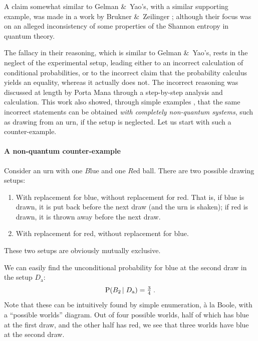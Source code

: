 \documentclass[\ifafour a4paper,12pt,\else a5paper,10pt,\fi%
onecolumn,oneside,article,%
british%
]{memoir}
\theoremstyle{remark}
\theoremstyle{innote}
\newcommand*{\citey}{\parencites*}
\newcommand*{\amp}{\&}
\newcommand*{\p}{\mathrm{P}}%
\renewcommand*{\|}[1][]{\nonscript\,#1\vert\nonscript\;\mathopen{}}
\newcommand*{\sect}{\S}%
\newcommand*{\yDa}{D_{\textrm{a}}}
\begin{document}
A claim somewhat similar to Gelman \amp\ Yao's, with a similar supporting
example, was made in a work by Brukner \amp\ Zeilinger
\citey{brukneretal2001}; although their focus was on an alleged
inconsistency of some properties of the Shannon entropy in quantum theory.

The fallacy in their reasoning, which is similar to Gelman \amp\ Yao's,
rests in the neglect of the experimental setup, leading either to an
incorrect calculation of conditional probabilities, or to the incorrect
claim that the probability calculus yields an equality, whereas it actually
does not. The incorrect reasoning was discussed at length by Porta Mana
\citey{portamana2003_r2004} through a step-by-step analysis and
calculation. This work also showed, through simple examples
\parencite[\sect~IV]{portamana2003_r2004}, that the same incorrect
statements can be obtained \emph{with completely non-quantum systems}, such
as drawing from an urn, if the setup is neglected. Let us start with such a
counter-example.

\bigskip

\paragraph{A non-quantum counter-example}

Consider an urn with one $B$lue and one $R$ed ball. There are two possible
drawing setups:
\begin{enumerate}[label=$D_{\textrm{\alph*}}$]
\item\label{item:repB} With replacement for blue, without replacement for
  red. That is, if blue is drawn, it is put back before the next draw (and
  the urn is shaken); if red is drawn, it is thrown away before the next
  draw.
\item \label{item:repR} With replacement for red, without replacement for blue.
\end{enumerate}
These two setups are obviously mutually exclusive.

We can easily find the unconditional probability for blue at the
second draw in the setup $\yDa$:
\begin{equation}
  \label{eq:A_red2}
  \p(B_{2} \| \yDa) = \tfrac{3}{4} \;.
\end{equation}
Note that these can be intuitively found by simple enumeration, \`a la
Boole, with a \enquote{possible worlds} diagram. Out of four possible
worlds, half of which has blue at the first draw, and the other half has
red, we see that three worlds have blue at the second draw.
\end{document}
